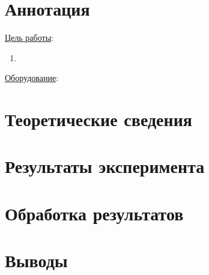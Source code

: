 \section{Аннотация}

\underline{Цель работы}: 
\begin{enumerate}
    \item 
\end{enumerate} \par
\underline{Оборудование}:

\section{Теоретические сведения}

\section{Результаты эксперимента}

\section{Обработка результатов}

\section{Выводы}

\newpage


